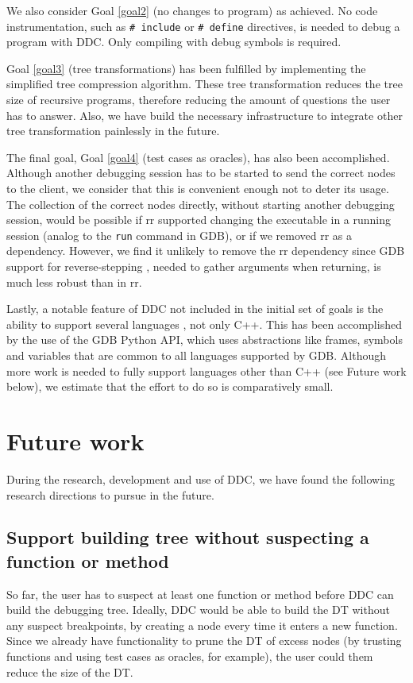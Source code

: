 We also consider Goal \ref{goal2} (no changes to program) as achieved. No code instrumentation, such as \verb|# include| or \verb|# define| directives, is needed to debug a program with DDC. Only compiling with debug symbols is required.

Goal \ref{goal3} (tree transformations) has been fulfilled by implementing the simplified tree compression algorithm. These tree transformation reduces the tree size of recursive programs, therefore reducing the amount of questions the user has to answer. Also, we have build the necessary infrastructure to integrate other tree transformation painlessly in the future.

The final goal, Goal \ref{goal4} (test cases as oracles), has also been accomplished. Although another debugging session has to be started to send the correct nodes to the client, we consider that this is convenient enough not to deter its usage. The collection of the correct nodes directly, without starting another debugging session, would be possible if rr supported changing the executable in a running session (analog to the \verb|run| command in GDB), or if we removed rr as a dependency. However, we find it unlikely to remove the rr dependency since GDB support for reverse-stepping \cite{ReverseExecution_GDB}, needed to gather arguments when returning, is much less robust than in rr.

Lastly, a notable feature of DDC not included in the initial set of goals is the ability to support several languages \cite{SupportedLanguaged_GDB}, not only C++. This has been accomplished by the use of the GDB Python API, which uses abstractions like frames, symbols and variables that are common to all languages supported by GDB. Although more work is needed to fully support languages other than C++ (see Future work below), we estimate that the effort to do so is comparatively small.
\section{Future work}
During the research, development and use of DDC, we have found the following research directions to pursue in the future.

\subsection{Support building tree without suspecting a function or method}
So far, the user has to suspect at least one function or method before DDC can build the debugging tree.
Ideally, DDC would be able to build the DT without any suspect breakpoints, by creating a node every time it enters a new function.
Since we already have functionality to prune the DT of excess nodes (by trusting functions and using test cases as oracles, for example), the user could them reduce the size of the DT.

